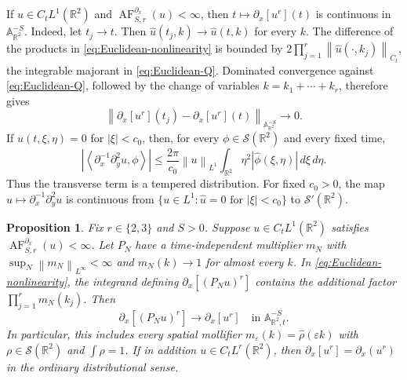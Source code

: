 \documentclass[12pt,reqno,letterpaper]{amsart}
\numberwithin{equation}{section}
\newtheorem{proposition}[theorem]{Proposition}
\theoremstyle{definition}
\newcommand{\R}{\mathbb R}
\newcommand{\A}{\mathbb A}
\newcommand{\eps}{\varepsilon}
\newcommand{\ip}[2]{\left\langle #1,#2\right\rangle}
\newcommand{\norm}[1]{\left\lVert #1\right\rVert}
\newcommand{\abs}[1]{\left\lvert #1\right\rvert}
\begin{document}
If $u\in C_tL^1(\R^2)$ and
$\operatorname{AF}^{\partial_x}_{S,r}(u)<\infty$, then
$t\mapsto\partial_x[u^r](t)$ is continuous in $\A^{-S}_{\R^2}$.
Indeed, let $t_j\to t$.  Then
$\widehat u(t_j,k)\to\widehat u(t,k)$ for every
$k$.  The difference of the products in
\eqref{eq:Euclidean-nonlinearity} is bounded by
$2\prod_{j=1}^r\norm{\widehat u(\cdot,k_j)}_{C_t}$, the integrable
majorant in \eqref{eq:Euclidean-Q}.  Dominated convergence against
\eqref{eq:Euclidean-Q}, followed by the change of variables
$k=k_1+\cdots+k_r$, therefore gives
\[
 \norm{\partial_x[u^r](t_j)-\partial_x[u^r](t)}
       _{\A^{-S}_{\R^2}}\longrightarrow0.
\]
If $\widehat u(t,\xi,\eta)=0$ for $\abs\xi<c_0$, then, for every
$\phi\in\mathcal S(\R^2)$ and every fixed time,
\begin{equation}\label{eq:Euclidean-transverse-pairing}
 \abs{\ip{\partial_x^{-1}\partial_y^2u}{\phi}}
 \leq \frac{2\pi}{c_0}\norm{u}_{L^1}
 \int_{\R^2}\eta^2\abs{\widehat\phi(\xi,\eta)}\,d\xi\,d\eta.
\end{equation}
Thus the transverse term is a tempered distribution.  For fixed $c_0>0$,
the map $u\mapsto\partial_x^{-1}\partial_y^2u$ is continuous from
$\{u\in L^1:\widehat u=0\text{ for }\abs\xi<c_0\}$ to
$\mathcal S'(\R^2)$.

\begin{proposition}
\label{prop:Euclidean-cutoff}
Fix $r\in\{2,3\}$ and $S>0$.  Suppose $u\in C_tL^1(\R^2)$ satisfies
$\operatorname{AF}^{\partial_x}_{S,r}(u)<\infty$.  Let $P_N$ have a time-independent
multiplier $m_N$ with $\sup_N\norm{m_N}_{L^\infty}<\infty$ and
$m_N(k)\to1$ for almost every $k$.  In \eqref{eq:Euclidean-nonlinearity},
the integrand defining $\partial_x[(P_Nu)^r]$ contains the additional
factor $\prod_{j=1}^rm_N(k_j)$.  Then
\begin{equation}\label{eq:Euclidean-cutoff-independence}
 \partial_x[(P_Nu)^r]\longrightarrow\partial_x[u^r]
 \quad\text{in }\A^{-S}_{\R^2,t}.
\end{equation}
In particular, this includes every spatial mollifier
$m_\eps(k)=\widehat\rho(\eps k)$ with $\rho\in\mathcal S(\R^2)$ and
$\int\rho=1$.  If in addition $u\in C_tL^r(\R^2)$, then
$\partial_x[u^r]=\partial_x(u^r)$ in the ordinary distributional sense.
\end{proposition}
\end{document}
